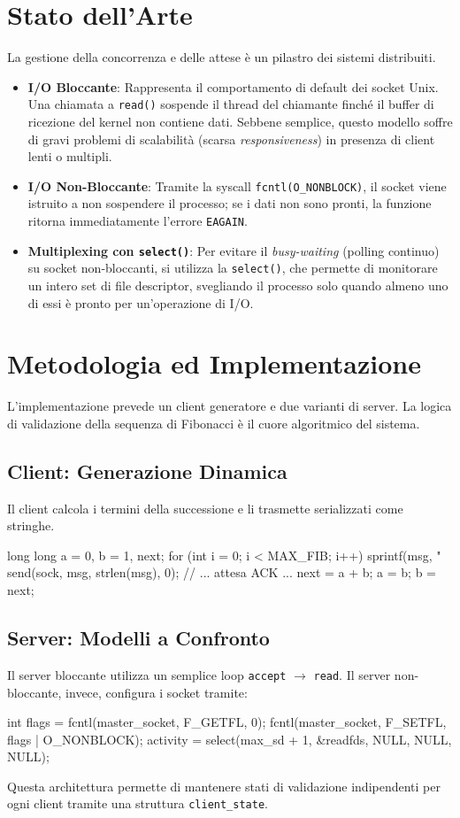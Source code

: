 \documentclass[a4paper,12pt]{article}
\begin{document}
\section{Stato dell'Arte}
La gestione della concorrenza e delle attese è un pilastro dei sistemi distribuiti.
\begin{itemize}
    \item \textbf{I/O Bloccante}: Rappresenta il comportamento di default dei socket Unix. Una chiamata a \texttt{read()} sospende il thread del chiamante finché il buffer di ricezione del kernel non contiene dati. Sebbene semplice, questo modello soffre di gravi problemi di scalabilità (scarsa \textit{responsiveness}) in presenza di client lenti o multipli.
    \item \textbf{I/O Non-Bloccante}: Tramite la syscall \texttt{fcntl(O_NONBLOCK)}, il socket viene istruito a non sospendere il processo; se i dati non sono pronti, la funzione ritorna immediatamente l'errore \texttt{EAGAIN}.
    \item \textbf{Multiplexing con \texttt{select()}}: Per evitare il \textit{busy-waiting} (polling continuo) su socket non-bloccanti, si utilizza la \texttt{select()}, che permette di monitorare un intero set di file descriptor, svegliando il processo solo quando almeno uno di essi è pronto per un'operazione di I/O.
\end{itemize}

\section{Metodologia ed Implementazione}
L'implementazione prevede un client generatore e due varianti di server. La logica di validazione della sequenza di Fibonacci è il cuore algoritmico del sistema.

\subsection{Client: Generazione Dinamica}
Il client calcola i termini della successione e li trasmette serializzati come stringhe.
\begin{ccode}
long long a = 0, b = 1, next;
for (int i = 0; i < MAX_FIB; i++) {
    sprintf(msg, "%
    send(sock, msg, strlen(msg), 0);
    // ... attesa ACK ...
    next = a + b; a = b; b = next;
}
\end{ccode}

\subsection{Server: Modelli a Confronto}
Il server bloccante utilizza un semplice loop \texttt{accept} $\rightarrow$ \texttt{read}. Il server non-bloccante, invece, configura i socket tramite:
\begin{ccode}
int flags = fcntl(master_socket, F_GETFL, 0);
fcntl(master_socket, F_SETFL, flags | O_NONBLOCK);
activity = select(max_sd + 1, &readfds, NULL, NULL, NULL);
\end{ccode}
Questa architettura permette di mantenere stati di validazione indipendenti per ogni client tramite una struttura \texttt{client_state}.
\end{document}
